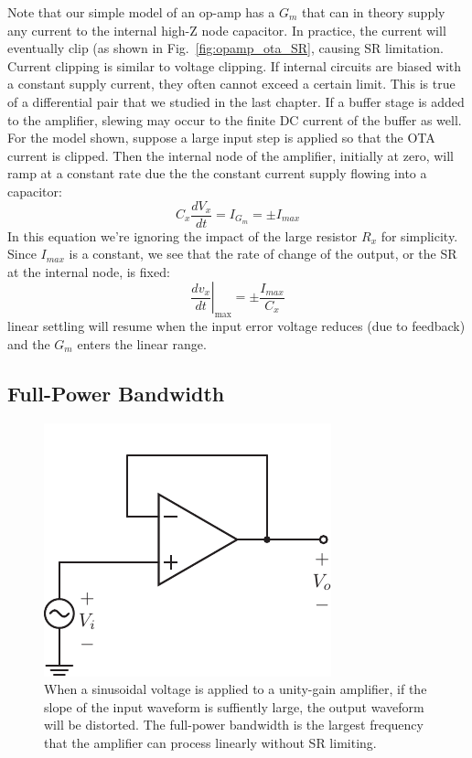 Note that our simple model of an op-amp has a $G_m$ that can in theory supply any current to the internal high-Z node capacitor. In practice, the current will eventually clip (as shown in Fig.~\ref{fig:opamp_ota_SR}, causing SR limitation.  Current clipping is similar to voltage clipping. If internal circuits are biased with a constant supply current, they often cannot exceed a certain limit.  This is true of a differential pair that we studied in the last chapter.  If a buffer stage is added to the amplifier, slewing may occur to the finite DC current of the buffer as well.  For the model shown, suppose a large input step is applied so that the OTA current is clipped.  Then the internal node of the amplifier, initially at zero, will ramp at a constant rate due the the constant current supply flowing into a capacitor:
%
\begin{equation}
	C_x \frac{dV_x}{dt} = I_{G_m} = \pm I_{max} 
\end{equation}
%
In this equation we're ignoring the impact of the large resistor $R_x$ for simplicity.  Since $I_{max}$ is a constant, we see that the rate of change of the output, or the SR at the internal node, is fixed:
%
\begin{equation}
	\left.	\frac{dv_x}{dt} \right|_{\text{max}} = \pm \frac{I_{max}}{C_x} 
\end{equation}
%
linear settling will resume when the input error voltage reduces (due to feedback) and the $G_m$ enters the linear range.


\subsection{Full-Power Bandwidth}


\begin{figure}[tb]
\begin{center}
\includegraphics[scale=1]{opamp_unitygain}
\end{center}
\caption{When a sinusoidal voltage is applied to a unity-gain amplifier, if the slope of the input waveform is suffiently large, the output waveform will be distorted.  The full-power bandwidth is the largest frequency that the amplifier can process linearly without SR limiting.} \label{fig:opamp_unitygain}
\end{figure}

